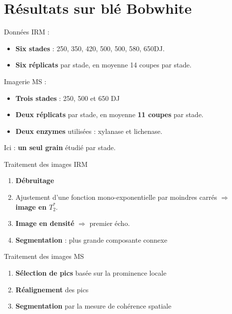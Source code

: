 \documentclass[10pt]{beamer}
\begin{document}
\section{Résultats sur blé Bobwhite}

\begin{frame}{Données}
  IRM :
  \begin{itemize}
  \item \textbf{Six stades} : 250, 350, 420, 500, 500, 580, 650DJ.
  \item \textbf{Six réplicats} par stade, en moyenne 14 coupes par stade.
  \end{itemize}


  Imagerie MS :
  \begin{itemize}
  \item  \textbf{Trois stades} : 250, 500 et 650 DJ
  \item  \textbf{Deux réplicats} par stade, en moyenne \textbf{11 coupes} par stade.
  \item  \textbf{Deux enzymes} utilisées : xylanase et lichenase.
  \end{itemize}

Ici : \textbf{un seul grain} étudié par stade.

\end{frame}

\begin{frame}{Traitement des images IRM}

  \begin{enumerate}
  \item \textbf{Débruitage}
  \item Ajustement d'une fonction mono-exponentielle par moindres carrés $\Rightarrow$ \textbf{image en $T_2^*$}.
  \item \textbf{Image en densité} $\Rightarrow$ premier écho.
  \item \textbf{Segmentation} : plus grande composante connexe
  \end{enumerate}

\end{frame}

\begin{frame}{Traitement des images MS}
  \begin{enumerate}
  \item \textbf{Sélection de pics} basée sur la prominence locale
  \item \textbf{Réalignement} des pics
  \item \textbf{Segmentation} par la mesure de cohérence spatiale
  \end{enumerate}
\end{frame}
\end{document}
